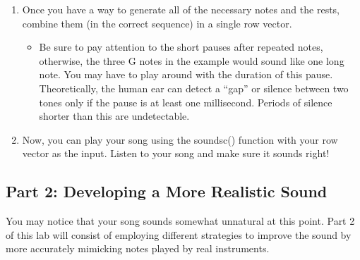 \documentclass[12pt]{article}
\begin{document}
\begin{enumerate}
\item Once you have a way to generate all of the necessary notes and the rests, combine them (in the correct sequence) in a single row vector. 
\begin{itemize}
    \item Be sure to pay attention to the short pauses after repeated notes, otherwise, the three G notes in the example would sound like one long note. You may have to play around with the duration of this pause. Theoretically, the human ear can detect a “gap” or silence between two tones only if the pause is at least one millisecond. Periods of silence shorter than this are undetectable.
\end{itemize}

\item Now, you can play your song using the soundsc() function with your row vector as the input. Listen to your song and make sure it sounds right!

\end{enumerate}
\subsection{Part 2: Developing a More Realistic Sound}

You may notice that your song sounds somewhat unnatural at this point. Part 2 of this lab will consist of employing different strategies to improve the sound by more accurately mimicking notes played by real instruments. 
\end{document}
